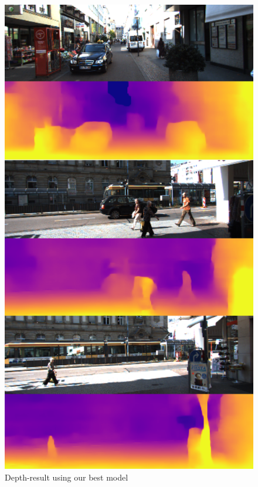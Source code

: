 \documentclass[10pt,twocolumn,letterpaper]{article}
\begin{document}
\begin{figure}[t]
  \includegraphics[width=\columnwidth]{dresult.png}
  \caption{Depth-result using our best model}
  \label{fig:depth_result}
\end{figure}
\end{document}

